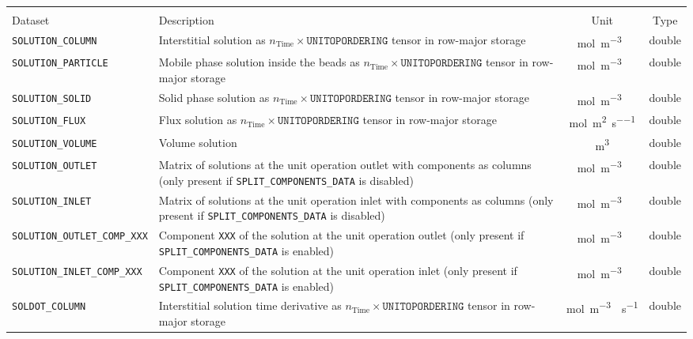 \begin{table}[!ht]
\footnotesize
\begin{tabu}to \linewidth[m]{lX[m]cc} \toprule
{} \\
\rowfont[c]\normalfont Dataset & Description & Unit & Type \everyrow{\midrule}\\
\texttt{SOLUTION\_COLUMN} & Interstitial solution as $n_{\text{Time}} \times \texttt{UNITOPORDERING}$ tensor in row-major storage & \si{\mol\per\cubic\metre{}} & double \\
\texttt{SOLUTION\_PARTICLE} & Mobile phase solution inside the beads as $n_{\text{Time}} \times \texttt{UNITOPORDERING}$ tensor in row-major storage & \si{\mol\per\cubic\metre{}} & double \\
\texttt{SOLUTION\_SOLID} & Solid phase solution as $n_{\text{Time}} \times \texttt{UNITOPORDERING}$ tensor in row-major storage & \si{\mol\per\cubic\metre{}} & double \\
\texttt{SOLUTION\_FLUX} & Flux solution as $n_{\text{Time}} \times \texttt{UNITOPORDERING}$ tensor in row-major storage & \si{\mol\per\square\metre\per\second} & double \\
\texttt{SOLUTION\_VOLUME} & Volume solution & \si{\cubic\metre} & double \\
\texttt{SOLUTION\_OUTLET} & Matrix of solutions at the unit operation outlet with components as columns (only present if \texttt{SPLIT\_COMPONENTS\_DATA} is disabled) & \si{\mol\per\cubic\metre{}} & double \\
\texttt{SOLUTION\_INLET} & Matrix of solutions at the unit operation inlet with components as columns (only present if \texttt{SPLIT\_COMPONENTS\_DATA} is disabled) & \si{\mol\per\cubic\metre{}} & double \\
\texttt{SOLUTION\_OUTLET\_COMP\_XXX} & Component \texttt{XXX} of the solution at the unit operation outlet (only present if \texttt{SPLIT\_COMPONENTS\_DATA} is enabled) & \si{\mol\per\cubic\metre{}} & double \\
\texttt{SOLUTION\_INLET\_COMP\_XXX} & Component \texttt{XXX} of the solution at the unit operation inlet (only present if \texttt{SPLIT\_COMPONENTS\_DATA} is enabled) & \si{\mol\per\cubic\metre{}} & double \\
\texttt{SOLDOT\_COLUMN} & Interstitial solution time derivative as $n_{\text{Time}} \times \texttt{UNITOPORDERING}$ tensor in row-major storage & \si{\mol\per\cubic\metre{}\per\second} & double \\

\end{tabu}
\end{table}
